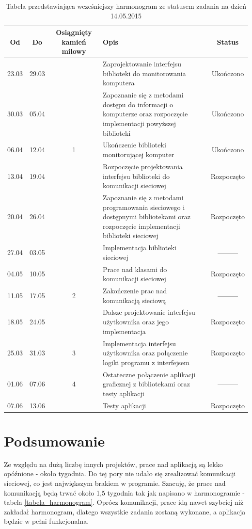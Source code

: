 \documentclass[a4paper]{article}
\begin{document}
		\begin{table}[h]
			\centering
			\begin{tabularx}{\linewidth}{|c|c|c|X|c|}
				\hline
				Od & Do & Osiągnięty kamień milowy & Opis & Status \\ \hline
				23.03 & 29.03 &  & Zaprojektowanie interfejsu biblioteki do monitorowania komputera & Ukończono  \\ \hline
				30.03 & 05.04 &  & Zapoznanie się z metodami dostępu do informacji o komputerze oraz rozpoczęcie implementacji powyższej biblioteki & Ukończono \\ \hline
				06.04 & 12.04 & 1 & Ukończenie biblioteki monitorującej komputer & Ukończono \\ \hline
				13.04 & 19.04 &   & Rozpoczęcie projektowania interfejsu biblioteki do komunikacji sieciowej & Rozpoczęto\\ \hline
				20.04 & 26.04 &  & Zapoznanie się z metodami programowania sieciowego i dostępnymi bibliotekami oraz  rozpoczęcie implementacji biblioteki sieciowej & Rozpoczęto \\ \hline
				27.04 & 03.05 &  & Implementacja biblioteki sieciowej & --------- \\ \hline
				04.05 & 10.05 &  & Prace nad klasami do komunikacji sieciowej & Rozpoczęto \\ \hline
				11.05 & 17.05 & 2  & Zakończenie prac nad komunikacją sieciową & --------- \\ \hline
				18.05 & 24.05 &  & Dalsze projektowanie interfejsu użytkownika oraz jego implementacja & Rozpoczęto \\ \hline
				25.03 & 31.03 & 3 & Implementacja interfejsu użytkownika oraz połączenie logiki programu z interfejsem & Rozpoczęto \\ \hline
				01.06 & 07.06 & 4 & Ostateczne połączenie aplikacji graficznej z bibliotekami oraz testy aplikacji & --------- \\ \hline
				07.06 & 13.06 &  & Testy aplikacji & Rozpoczęto \\ \hline
			\end{tabularx}
			\caption{Tabela przedstawiająca wcześniejszy harmonogram ze statusem zadania na dzień 14.05.2015}
			\label{tabela_harmonogram_stary}
		\end{table}

\section{Podsumowanie}
Ze względu na dużą liczbę innych projektów, prace nad aplikacją są lekko opóźnione - około tygodnia. Do tej pory nie udało się zrealizować komunikacji sieciowej, co jest największym brakiem w programie. Szacuję, że prace nad komunikacją będą trwać około 1,5 tygodnia tak jak napisano w harmonogramie - tabela \ref{tabela_harmonogram}. Oprócz komunikacji, prace idą nawet szybciej niż zakładał harmonogram, dlatego wszystkie zadania zostaną wykonane, a aplikacja będzie w pełni funkcjonalna.
\end{document}
